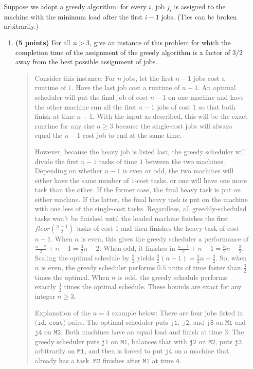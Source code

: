 \documentclass[11pt]{article}
\newcommand{\code}[1]{$\texttt{#1}$}
\begin{document}
\begin{enumerate}
Suppose we adopt a greedy algorithm: for every $i$, job $j_i$ is assigned to the
machine with the minimum load after the first $i-1$ jobs.  (Ties can
be broken arbitrarily.) 
\begin{enumerate}
\item
{\bf (5 points)} 
For all $n > 3$, give an instance of this problem for which
the completion time of the assignment of the greedy algorithm is a factor of $3/2$ away from the best
possible assignment of jobs.
\begin{quote}
  \color{purple}
Consider this instance: For $n$ jobs, let the first $n - 1$ jobs cost a runtime of $1$. Have the last job cost a runtime of $n - 1$. An optimal scheduler will put the final job of cost $n - 1$ on one machine and have the other machine run all the first $n - 1$ jobs of cost $1$ so that both finish at time $n - 1$. With the input as-described, this will be the exact runtime for any size $n \geq 3$ because the single-cost jobs will always equal the $n - 1$ cost job to end at the same time.

\medskip
However, because the heavy job is listed last, the greedy scheduler will divide the first $n - 1$ tasks of time $1$ between the two machines. Depending on whether $n - 1$ is even or odd, the two machines will either have the same number of $1$-cost tasks, or one will have one more task than the other. If the former case, the final heavy task is put on either machine. If the latter, the final heavy task is put on the machine with one less of the single-cost tasks. Regardless, all greedily-scheduled tasks won't be finished until the loaded machine finishes the first $floor(\frac{n - 1}{2})$ tasks of cost $1$ and then finishes the heavy task of cost $n - 1$. When $n$ is even, this gives the greedy scheduler a performance of $\frac{n - 2}{2} + n - 1 = \frac{3}{2}n - 2$. When odd, it finishes in $\frac{n - 1}{2} + n - 1 = \frac{3}{2}n - \frac{3}{2}$. Scaling the optimal schedule by $\frac{3}{2}$ yields $\frac{3}{2}(n - 1) = \frac{3}{2}n - \frac{3}{2}$. So, when $n$ is even, the greedy scheduler performs $0.5$ units of time faster than $\frac{3}{2}$ times the optimal. When $n$ is odd, the greedy schedule performs exactly $\frac{3}{2}$ times the optimal schedule. These bounds are exact for any integer $n \geq 3$.

\medskip
Explanation of the $n = 4$ example below: There are four jobs listed in \code{(id, cost)} pairs. The optimal scheduler puts \code{j1}, \code{j2}, and \code{j3} on \code{M1} and \code{j4} on \code{M2}. Both machines have an equal load and finish at time $3$. The greedy scheduler puts \code{j1} on \code{M1}, balances that with \code{j2} on \code{M2}, puts \code{j3} arbitrarily on \code{M1}, and then is forced to put \code{j4} on a machine that already has a task. \code{M2} finishes after \code{M1} at time \code{4}.


\end{quote}
\end{enumerate}
\end{enumerate}
\end{document}
